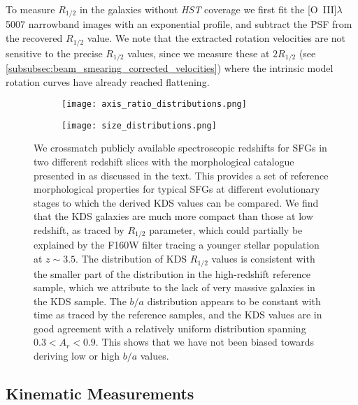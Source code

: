 \documentclass[fleqn,usenatbib]{mn2e}
\begin{document}
To measure $R_{1/2}$ in the galaxies without {\em HST} coverage we first fit the [O~{\sc III}]$\lambda$5007 narrowband images with an exponential profile, and subtract the PSF from the recovered $R_{1/2}$ value.
We note that the extracted rotation velocities are not sensitive to the precise $R_{1/2}$ values, since we measure these at $2R_{1/2}$ (see \cref{subsubsec:beam_smearing_corrected_velocities}) where the intrinsic model rotation curves have already reached flattening. \\

\begin{figure*}
    \centering \hspace{-2.0cm}
    \begin{subfigure}[h!]{0.50\textwidth}
        \centering
        \texttt{[image: axis\_ratio\_distributions.png]}
    \end{subfigure} \hspace{0.4cm}
    \begin{subfigure}[h!]{0.50\textwidth}
        \centering
        \texttt{[image: size\_distributions.png]}
    \end{subfigure}
    \caption{We crossmatch publicly available spectroscopic redshifts for SFGs in two different redshift slices with the morphological catalogue presented in \protect\cite{VanderWel2012} as discussed in the text.
    This provides a set of reference morphological properties for typical SFGs at different evolutionary stages to which the derived KDS values can be compared.
    We find that the KDS galaxies are much more compact than those at low redshift, as traced by $R_{1/2}$ parameter, which could partially be explained by the F160W filter tracing a younger stellar population at $z\sim3.5$.
    The distribution of KDS $R_{1/2}$ values is consistent with the smaller part of the distribution in the high-redshift reference sample, which we attribute to the lack of very massive galaxies in the KDS sample.
    The $b/a$ distribution appears to be constant with time as traced by the reference samples, and the KDS values are in good agreement with a relatively uniform distribution spanning $0.3 < A_{r} < 0.9$.
    This shows that we have not been biased towards deriving low or high $b/a$ values.}
    \label{fig:morpho-distributions}
\end{figure*}

\subsection{Kinematic Measurements}\label{subsection:kinematic_measurements}
\end{document}
